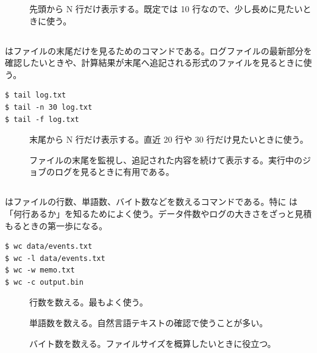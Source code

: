 \begin{description}
\item[] 先頭から N 行だけ表示する。既定では 10 行なので、少し長めに見たいときに使う。
\end{description}

\subsection{}

 はファイルの末尾だけを見るためのコマンドである。ログファイルの最新部分を確認したいときや、計算結果が末尾へ追記される形式のファイルを見るときに使う。

\begin{lstlisting}[numbers=none, xleftmargin=2\zw]
$ tail log.txt
$ tail -n 30 log.txt
$ tail -f log.txt
\end{lstlisting}

\begin{description}
\item[] 末尾から N 行だけ表示する。直近 20 行や 30 行だけ見たいときに使う。
\item[] ファイルの末尾を監視し、追記された内容を続けて表示する。実行中のジョブのログを見るときに有用である。
\end{description}

\subsection{}

 はファイルの行数、単語数、バイト数などを数えるコマンドである。特に  は「何行あるか」を知るためによく使う。データ件数やログの大きさをざっと見積もるときの第一歩になる。

\begin{lstlisting}[numbers=none, xleftmargin=2\zw]
$ wc data/events.txt
$ wc -l data/events.txt
$ wc -w memo.txt
$ wc -c output.bin
\end{lstlisting}

\begin{description}
\item[] 行数を数える。最もよく使う。
\item[] 単語数を数える。自然言語テキストの確認で使うことが多い。
\item[] バイト数を数える。ファイルサイズを概算したいときに役立つ。
\end{description}

